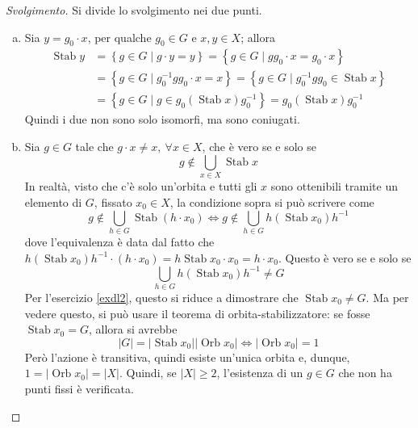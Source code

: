 \documentclass[12pt]{scrartcl}
\theoremstyle{style}
\newenvironment{svolgimento}{\renewcommand\qedsymbol{$\blacksquare$}\begin{proof}[Svolgimento]}{\end{proof}}
\numberwithin{equation}{subsection}
\begin{document}
\begin{svolgimento}
	Si divide lo svolgimento nei due punti.
	\begin{enumerate}[(a).]
		\item Sia $y = g_0\cdot x$, per qualche $g_0 \in G$ e $x,y \in X$; allora 
			\[
			\begin{split}
				\operatorname{Stab} y &= \left\{ g\in G  \mid g \cdot y= y  \right\} = \left\{ g\in G \mid gg_0 \cdot x = g_0 \cdot x \right\} \\
						      &= \left\{ g \in G  \mid g_0^{-1}g g_0 \cdot x =x \right\} = \left\{ g \in G  \mid g_0^{-1}g g_0 \in \operatorname{Stab} x \right\} \\
						      &= \left\{ g \in G  \mid g \in g_0 (\operatorname{Stab} x) g_0^{-1} \right\} = g_0 (\operatorname{Stab} x) g_0^{-1}
			\end{split}
			\] 
			Quindi i due non sono solo isomorfi, ma sono coniugati.
		\item Sia $g \in G$ tale che $g\cdot x \neq x, \ \forall x \in X$, che \`e vero se e solo se
			\[
			g \not \in \bigcup_{x \in X} \operatorname{Stab} x
			\] 
			In realt\`a, visto che c'\`e solo un'orbita e tutti gli $x$ sono ottenibili tramite un elemento di $G$, fissato $x_0 \in X$, la condizione sopra si pu\`o scrivere come
			\[
			g\not \in \bigcup_{h \in G} \operatorname{Stab} (h\cdot x_0) \iff g \not \in \bigcup_{h \in G} h(\operatorname{Stab} x_0)h^{-1}
			\] 
			dove l'equivalenza \`e data dal fatto che $h(\operatorname{Stab} x_0)h^{-1} \cdot (h\cdot x_0) = h \operatorname{Stab} x_0 \cdot x_0 = h \cdot x_0$.
			Questo \`e vero se e solo se 
			\[
			\bigcup_{h \in G} h(\operatorname{Stab} x_0) h^{-1}\neq G
			\] 
			Per l'esercizio \ref{exdl2}, questo si riduce a dimostrare che $\operatorname{Stab} x_0 \neq G$.
			Ma per vedere questo, si pu\`o usare il teorema di orbita-stabilizzatore: se fosse $\operatorname{Stab} x_0 = G$, allora si avrebbe
			\[
			\lvert G \rvert  = \lvert \operatorname{Stab} x_0 \rvert \lvert \operatorname{Orb} x_0 \rvert \iff \lvert \operatorname{Orb} x_0 \rvert =1
			\] 
			Per\`o l'azione \`e transitiva, quindi esiste un'unica orbita e, dunque, $1=\lvert \operatorname{Orb} x_0 \rvert  = \lvert X \rvert $.
			Quindi, se $\lvert X \rvert  \ge 2$, l'esistenza di un $g \in G$ che non ha punti fissi \`e verificata.
	\end{enumerate}
\end{svolgimento}
\end{document}
